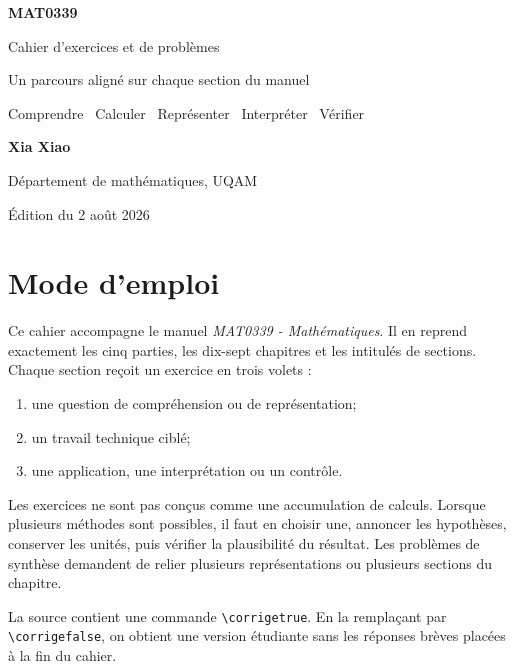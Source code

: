 \documentclass[11pt,a4paper,openany]{book}
\newif\ifcorrige
\begin{document}
\color{ink}\frontmatter
\begin{titlepage}\centering
\vspace*{2.1cm}
{\Huge\sffamily\bfseries\color{navy} MAT0339\par}\vspace{0.3cm}
{\LARGE\sffamily\color{ink} Cahier d'exercices et de problèmes\par}\vspace{0.65cm}
{\large\sffamily\color{teal} Un parcours aligné sur chaque section du manuel\par}\vspace{1.3cm}
\begin{tcolorbox}[width=0.76\textwidth,colback=mistteal,borderline west={3pt}{0pt}{teal}]
\centering\sffamily
Comprendre \textbullet\ Calculer \textbullet\ Représenter \textbullet\ Interpréter \textbullet\ Vérifier
\end{tcolorbox}
\vfill
{\Large\sffamily\bfseries\color{navy} Xia Xiao\par}\vspace{0.2cm}
{\large\sffamily\color{slate} Département de mathématiques, UQAM\par}\vspace{0.7cm}
{\large\sffamily\color{teal} Édition du 2 août 2026\par}
\end{titlepage}
\chapter*{Mode d'emploi}
Ce cahier accompagne le manuel \emph{MAT0339 - Mathématiques}. Il en reprend exactement les cinq parties, les dix-sept chapitres et les intitulés de sections. Chaque section reçoit un exercice en trois volets :
\begin{enumerate}
\item une question de compréhension ou de représentation;
\item un travail technique ciblé;
\item une application, une interprétation ou un contrôle.
\end{enumerate}
\begin{designbox}
Les exercices ne sont pas conçus comme une accumulation de calculs. Lorsque plusieurs méthodes sont possibles, il faut en choisir une, annoncer les hypothèses, conserver les unités, puis vérifier la plausibilité du résultat. Les problèmes de synthèse demandent de relier plusieurs représentations ou plusieurs sections du chapitre.
\end{designbox}
La source contient une commande \verb|\corrigetrue|. En la remplaçant par \verb|\corrigefalse|, on obtient une version étudiante sans les réponses brèves placées à la fin du cahier.
\tableofcontents\mainmatter
\end{document}
